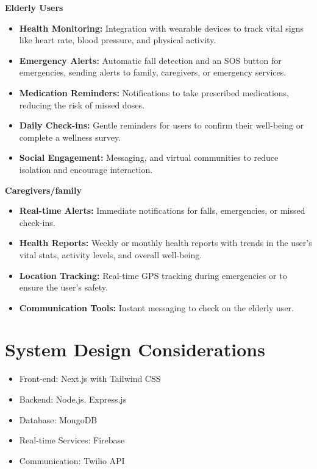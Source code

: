 \textbf{\large Elderly Users} 
\begin{itemize}
    \item \textbf{Health Monitoring:} Integration with wearable devices to track vital signs like heart rate, blood pressure, and physical activity. 
    \item \textbf{Emergency Alerts:} Automatic fall detection and an SOS button for emergencies, sending alerts to family, caregivers, or emergency services.
    \item \textbf{Medication Reminders:} Notifications to take prescribed medications, reducing the risk of missed doses. 
    \item \textbf{Daily Check-ins:} Gentle reminders for users to confirm their well-being or complete a wellness survey.
    \item \textbf{Social Engagement:} Messaging, and virtual communities to reduce isolation and encourage interaction.
\end{itemize}
\textbf{\large Caregivers/family} 
\begin{itemize}
    \item \textbf{Real-time Alerts:} Immediate notifications for falls, emergencies, or missed check-ins.
    \item \textbf{Health Reports:} Weekly or monthly health reports with trends in the user's vital stats, activity levels, and overall well-being.
    \item \textbf{Location Tracking:} Real-time GPS tracking during emergencies or to ensure the user's safety.
    \item \textbf{Communication Tools:} Instant messaging to check on the elderly user.
\end{itemize}
\section{System Design Considerations} 
\begin{itemize}
    \item Front-end: Next.js with Tailwind CSS
    \item Backend: Node.js, Express.js
    \item Database: MongoDB
    \item Real-time Services: Firebase
    \item Communication: Twilio API
\end{itemize}
